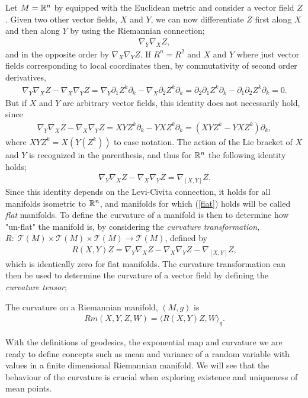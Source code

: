 Let $M = \mathbb{R}^n$ by equipped with the Euclidean metric and consider a vector field $Z$. Given two other vector fields, $X$ and $Y$, we can now differentiate $Z$ first along $X$ and then along $Y$ by using the Riemannian connection;
\begin{align*}
\nabla_Y \nabla_X Z,
\end{align*}
and in the opposite order by $\nabla_X \nabla_Y Z$. If $R^n = R^2$ and $X$ and $Y$ where just vector fields corresponding to local coordinates then, by commutativity of second order derivatives,
\begin{align*}
\nabla_Y \nabla_X Z - \nabla_X \nabla_Y Z = \nabla_Y \partial_1 Z^k \partial_k - \nabla_X \partial_2 Z^k \partial_k = \partial_2 \partial_1 Z^k \partial_k - \partial_1 \partial_2 Z^k \partial_k = 0.
\end{align*}
But if $X$ and $Y$ are arbitrary vector fields, this identity does not necessarily hold, since
\begin{align*}
\nabla_Y \nabla_X Z - \nabla_X \nabla_Y Z = XYZ^k \partial_k - YXZ^k \partial_k = (XYZ^k - YXZ^k)\partial_k,
\end{align*}
where $XYZ^k = X \left( Y \left( Z^k \right) \right)$ to ease notation. The action of the Lie bracket of $X$ and $Y$ is recognized in the parenthesis, and thus for $\mathbb{R}^n$ the following identity holds;
\begin{align}\label{flat}
\nabla_Y \nabla_X Z - \nabla_X \nabla_Y Z = \nabla_{[X,Y]} Z.
\end{align}
Since this identity depends on the Levi-Civita connection, it holds for all manifolds isometric to $\mathbb{R}^n$, and manifolds for which (\ref{flat}) holds will be called \textit{flat} manifolds. To define the curvature of a manifold is then to determine how "un-flat" the manifold is, by considering the \textit{curvature transformation}, $R: \; \mathcal{T}(M) \times \mathcal{T}(M) \times \mathcal{T}(M) \rightarrow \mathcal{T}(M)$, defined by
\begin{align*}
R(X,Y)Z =  \nabla_Y \nabla_X Z - \nabla_X \nabla_Y Z - \nabla_{[X,Y]} Z,
\end{align*}
which is identically zero for flat manifolds. The curvature transformation can then be used to determine the curvature of a vector field by defining the \textit{curvature tensor};

\begin{definition}
The curvature on a Riemannian manifold, $(M, g)$ is
\begin{align*}
Rm(X,Y,Z,W) = \langle R(X,Y)Z, W \rangle_g.
\end{align*}
\end{definition}

With the definitions of geodesics, the exponential map and curvature we are ready to define concepts such as mean and variance of a random variable with values in a finite dimensional Riemannian manifold. We will see that the behaviour of the curvature is crucial when exploring existence and uniqueness of mean points.




